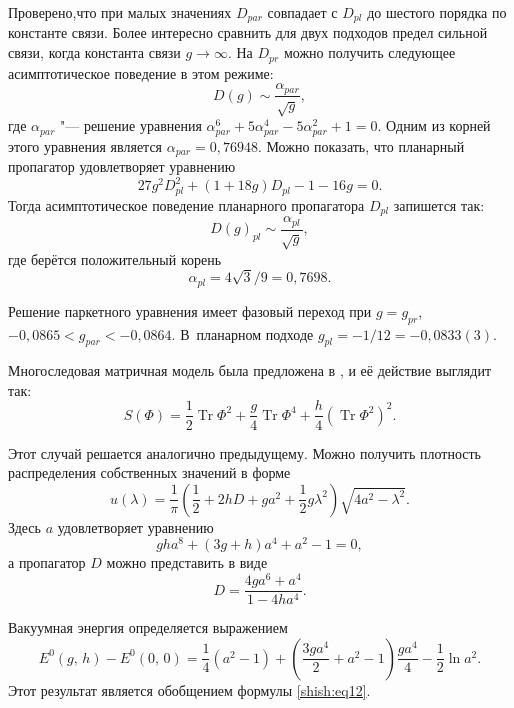 Проверено,что при малых значениях $D_{par}$ совпадает с $D_{pl}$ до шестого порядка по константе связи.
Более интересно сравнить для двух подходов предел сильной связи, когда константа связи $g\to \infty$.
На $D_{pr}$ можно получить следующее асимптотическое поведение в этом режиме:
$$
D(g)\sim \frac{\alpha_{par}}{\sqrt{g}},
$$
где $\alpha_{par}$ "--- решение уравнения
$
\alpha_{par}^6+5\alpha_{par}^4-5\alpha_{par}^2+1=0.
$
Одним из корней этого уравнения является  $\alpha_{par}=0,76948$.
Можно показать, что планарный пропагатор удовлетворяет уравнению
$$
27g^2D_{pl}^2+(1+18g)D_{pl}-1-16g=0.
$$
Тогда асимптотическое поведение планарного пропагатора $D_{pl}$ запишется так:
$$
D(g)_{pl}\sim \frac{\alpha_{pl}}{\sqrt{g}},
$$
где берётся положительный корень
$$
\alpha_{pl}={4\sqrt{3}}/{9}=0,7698.
$$

Решение паркетного уравнения имеет фазовый переход при $g=g_{pr}$, \linebreak \mbox{$-0,0865<g_{par}<-0,0864$.} В~планарном подходе
$g_{pl}=-1/12=-0,0833(3)$.

\smallskip

 Многоследовая матричная модель была предложена в \cite{shish:ddsw}, и её действие
выглядит так:
\begin{equation*}
S(\Phi)=\frac{1}{2}\mathop{\mathrm{Tr}}\nolimits  {\Phi}^2+\frac{g}{4}\mathop{\mathrm{Tr}}\nolimits  {\Phi}^4+
\frac{h}{4}{(\mathop{\mathrm{Tr}}\nolimits  {\Phi}^2)}^2.
\end{equation*}

Этот случай решается аналогично предыдущему. Можно получить
плотность распределения собственных значений в форме
\begin{equation}
\label{shish:eq12}
 u(\lambda)=\frac{1}{\pi}\left(\frac{1}{2}+2hD+ga^2+\frac{1}{2}g\lambda^2 \right) \sqrt{4a^2-\lambda^2}.
\end{equation}
Здесь $a$ удовлетворяет уравнению
\begin{equation*}
gha^8+(3g+h)a^4+a^2-1=0,
\end{equation*}
а пропагатор $D$ можно представить в виде
\begin{equation*}
D=\frac{4ga^6+a^4}{1-4ha^4}.
\end{equation*}

Вакуумная энергия определяется выражением
\begin{equation*}
E^0(g,\,h)-E^0(0,\,0)=\frac{1}{4}(a^2-1)+\left(\frac{3ga^4}{2}+a^2-1 \right) \frac{ga^4}{4}-\frac{1}{2}\ln a^2.
\end{equation*}
Этот результат является обобщением формулы \eqref{shish:eq12}.

